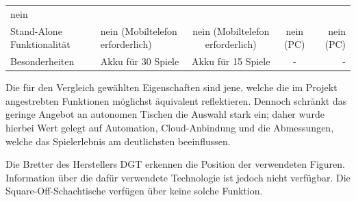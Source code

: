\begin{longtable}[]{@{}llccr@{}}
\begin{minipage}[t]{0.13\columnwidth}
nein\strut
\end{minipage}\tabularnewline
\begin{minipage}[t]{0.19\columnwidth}\raggedright
Stand-Alone Funktionalität\strut
\end{minipage} & \begin{minipage}[t]{0.19\columnwidth}\raggedright
nein (Mobiltelefon erforderlich)\strut
\end{minipage} & \begin{minipage}[t]{0.20\columnwidth}\centering
nein (Mobiltelefon erforderlich)\strut
\end{minipage} & \begin{minipage}[t]{0.15\columnwidth}\centering
nein (PC)\strut
\end{minipage} & \begin{minipage}[t]{0.13\columnwidth}\raggedleft
nein (PC)\strut
\end{minipage}\tabularnewline
\begin{minipage}[t]{0.19\columnwidth}\raggedright
Besonderheiten\strut
\end{minipage} & \begin{minipage}[t]{0.19\columnwidth}\raggedright
Akku für 30 Spiele\strut
\end{minipage} & \begin{minipage}[t]{0.20\columnwidth}\centering
Akku für 15 Spiele\strut
\end{minipage} & \begin{minipage}[t]{0.15\columnwidth}\centering
-\strut
\end{minipage} & \begin{minipage}[t]{0.13\columnwidth}\raggedleft
-\strut
\end{minipage}\tabularnewline
\bottomrule
\end{longtable}

Die für den Vergleich gewählten Eigenschaften sind jene, welche die im
Projekt angestrebten Funktionen möglichst äquivalent reflektieren.
Dennoch schränkt das geringe Angebot an autonomen Tischen die Auswahl
stark ein; daher wurde hierbei Wert gelegt auf Automation,
Cloud-Anbindung und die Abmessungen, welche das Spielerlebnis am
deutlichsten beeinflussen.

Die Bretter des Herstellers DGT erkennen die Position der verwendeten
Figuren. Information über die dafür verwendete Technologie ist jedoch
nicht verfügbar. Die Square-Off-Schachtische verfügen über keine solche
Funktion.

